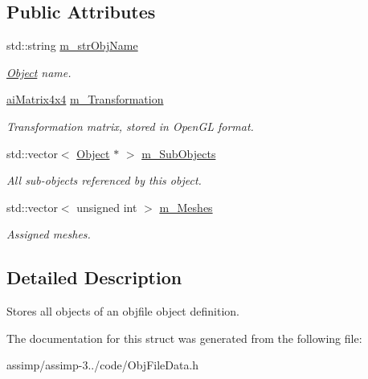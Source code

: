 \subsection*{Public Attributes}
\begin{DoxyCompactItemize}
\item 
\hypertarget{struct_assimp_1_1_obj_file_1_1_object_ac63114ad2dac9d65ac36d6926e874b05}{std\+::string \hyperlink{struct_assimp_1_1_obj_file_1_1_object_ac63114ad2dac9d65ac36d6926e874b05}{m\+\_\+str\+Obj\+Name}}\label{struct_assimp_1_1_obj_file_1_1_object_ac63114ad2dac9d65ac36d6926e874b05}

\begin{DoxyCompactList}\small\item\em \hyperlink{struct_assimp_1_1_obj_file_1_1_object}{Object} name. \end{DoxyCompactList}\item 
\hypertarget{struct_assimp_1_1_obj_file_1_1_object_a86c1aec1d2853623c558cab9a832baa7}{\hyperlink{structai_matrix4x4}{ai\+Matrix4x4} \hyperlink{struct_assimp_1_1_obj_file_1_1_object_a86c1aec1d2853623c558cab9a832baa7}{m\+\_\+\+Transformation}}\label{struct_assimp_1_1_obj_file_1_1_object_a86c1aec1d2853623c558cab9a832baa7}

\begin{DoxyCompactList}\small\item\em Transformation matrix, stored in Open\+G\+L format. \end{DoxyCompactList}\item 
\hypertarget{struct_assimp_1_1_obj_file_1_1_object_ac840b1d1102b755094e030373e9ebcd7}{std\+::vector$<$ \hyperlink{struct_assimp_1_1_obj_file_1_1_object}{Object} $\ast$ $>$ \hyperlink{struct_assimp_1_1_obj_file_1_1_object_ac840b1d1102b755094e030373e9ebcd7}{m\+\_\+\+Sub\+Objects}}\label{struct_assimp_1_1_obj_file_1_1_object_ac840b1d1102b755094e030373e9ebcd7}

\begin{DoxyCompactList}\small\item\em All sub-\/objects referenced by this object. \end{DoxyCompactList}\item 
\hypertarget{struct_assimp_1_1_obj_file_1_1_object_a7d501dba7934caa5183800a5727d5ab3}{std\+::vector$<$ unsigned int $>$ \hyperlink{struct_assimp_1_1_obj_file_1_1_object_a7d501dba7934caa5183800a5727d5ab3}{m\+\_\+\+Meshes}}\label{struct_assimp_1_1_obj_file_1_1_object_a7d501dba7934caa5183800a5727d5ab3}

\begin{DoxyCompactList}\small\item\em Assigned meshes. \end{DoxyCompactList}\end{DoxyCompactItemize}


\subsection{Detailed Description}
Stores all objects of an objfile object definition. 

The documentation for this struct was generated from the following file\+:\begin{DoxyCompactItemize}
\item 
assimp/assimp-\/3../code/Obj\+File\+Data.\+h\end{DoxyCompactItemize}
